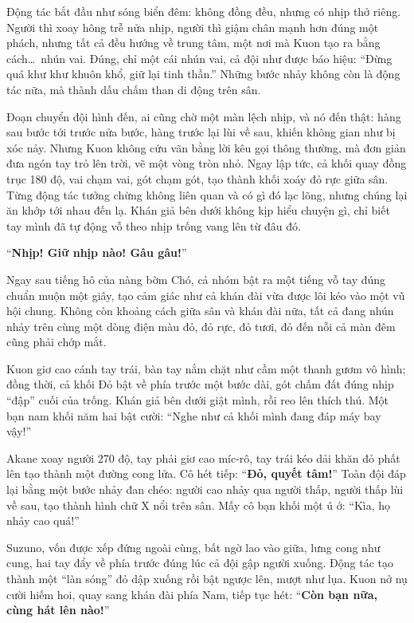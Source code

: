 \documentclass[../main.tex]{subfiles}
\begin{document}
Động tác bắt đầu như sóng biển đêm: không đồng đều, nhưng có nhịp thở riêng. Người thì xoay hông trễ nửa nhịp, người thì giậm chân mạnh hơn đúng một phách, nhưng tất cả đều hướng về trung tâm, một nơi mà Kuon tạo ra bằng cách\dots\ nhún vai. Đúng, chỉ một cái nhún vai, cả đội như được báo hiệu: ``Đừng quá khư khư khuôn khổ, giữ lại tinh thần.'' Những bước nhảy không còn là động tác nữa, mà thành dấu chấm than di động trên sân.

Đoạn chuyển đội hình đến, ai cũng chờ một màn lệch nhịp, và nó đến thật: hàng sau bước tới trước nửa bước, hàng trước lại lùi về sau, khiến không gian như bị xóc nảy. Nhưng Kuon không cứu vãn bằng lời kêu gọi thông thường, mà đơn giản đưa ngón tay trỏ lên trời, vẽ một vòng tròn nhỏ. Ngay lập tức, cả khối quay đồng trục 180 độ, vai chạm vai, gót chạm gót, tạo thành khối xoáy đỏ rực giữa sân. Từng động tác tưởng chừng không liên quan và có gì đó lạc lõng, nhưng chúng lại ăn khớp tới nhau đến lạ. Khán giả bên dưới không kịp hiểu chuyện gì, chỉ biết tay mình đã tự động vỗ theo nhịp trống vang lên từ đâu đó.

``\textbf{Nhịp! Giữ nhịp nào! Gâu gâu!}''

Ngay sau tiếng hô của nàng bờm Chó, cả nhóm bật ra một tiếng vỗ tay đúng chuẩn muộn một giây, tạo cảm giác như cả khán đài vừa được lôi kéo vào một vũ hội chung. Không còn khoảng cách giữa sân và khán đài nữa, tất cả đang nhún nhảy trên cùng một dòng điện màu đỏ, đỏ rực, đỏ tươi, đỏ đến nỗi cả màn đêm cũng phải chớp mắt.

Kuon giơ cao cánh tay trái, bàn tay nắm chặt như cầm một thanh gươm vô hình; đồng thời, cả khối Đỏ bật về phía trước một bước dài, gót chấm đất đúng nhịp ``đập'' cuối của trống. Khán giả bên dưới giật mình, rồi reo lên thích thú. Một bạn nam khối năm hai bật cười: ``Nghe như cả khối mình đang đáp máy bay vậy!''

Akane xoay người 270 độ, tay phải giơ cao míc-rô, tay trái kéo dải khăn đỏ phất lên tạo thành một đường cong lửa. Cô hét tiếp: ``\textbf{Đỏ, quyết tâm!}'' Toàn đội đáp lại bằng một bước nhảy đan chéo: người cao nhảy qua người thấp, người thấp lùi về sau, tạo thành hình chữ X nổi trên sân. Mấy cô bạn khối một ú ớ: ``Kìa, họ nhảy cao quá!''

Suzuno, vốn được xếp đứng ngoài cùng, bất ngờ lao vào giữa, lưng cong như cung, hai tay đẩy về phía trước đúng lúc cả đội gập người xuống. Động tác tạo thành một ``làn sóng'' đỏ dập xuống rồi bật ngược lên, mượt như lụa. Kuon nở nụ cười hiếm hoi, quay sang khán đài phía Nam, tiếp tục hét: ``\textbf{Còn bạn nữa, cùng hát lên nào!}''
\end{document}
